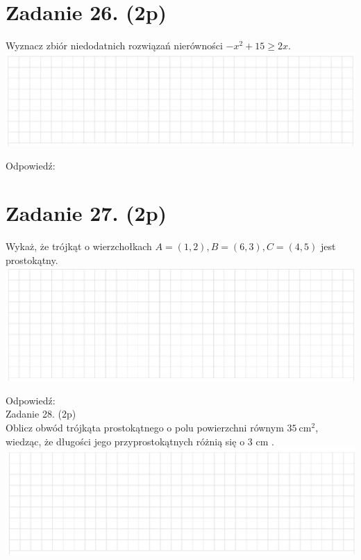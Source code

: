 \documentclass[10pt]{article}
\begin{document}
\section*{Zadanie 26. (2p)}
Wyznacz zbiór niedodatnich rozwiązań nierówności \(-x^{2}+15 \geq 2 x\).\\
\includegraphics[max width=\textwidth, center]{2024_11_21_cce9c7ad32a1dbcd58dag-09(2)}

Odpowiedź:

\section*{Zadanie 27. (2p)}
Wykaż, że trójkąt o wierzchołkach \(A=(1,2), B=(6,3), C=(4,5)\) jest prostokątny.\\
\includegraphics[max width=\textwidth, center]{2024_11_21_cce9c7ad32a1dbcd58dag-09}

Odpowiedź:\\
Zadanie 28. (2p)\\
Oblicz obwód trójkąta prostokątnego o polu powierzchni równym \(35 \mathrm{~cm}^{2}\), wiedząc, że długości jego przyprostokątnych różnią się o 3 cm .\\
\includegraphics[max width=\textwidth, center]{2024_11_21_cce9c7ad32a1dbcd58dag-09(1)}
\end{document}
